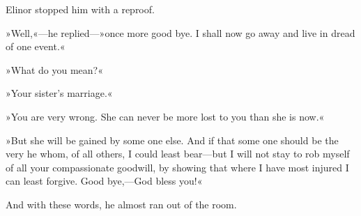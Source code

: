 Elinor stopped him with a reproof.

»Well,«—he replied—»once more good bye. I shall now go away and live in dread of one event.«

»What do you mean?«

»Your sister’s marriage.«

»You are very wrong. She can never be more lost to you than she is now.«

»But she will be gained by some one else. And if that some one should be the very he whom, of all others, I could least bear—but I will not stay to rob myself of all your compassionate goodwill, by showing that where I have most injured I can least forgive. Good bye,—God bless you!«

And with these words, he almost ran out of the room.